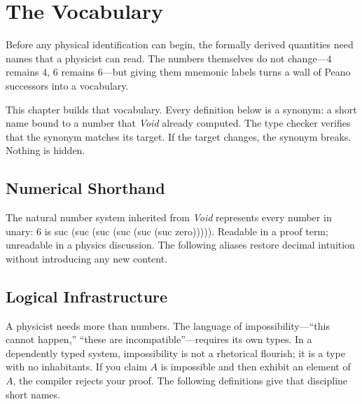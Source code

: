 \documentclass[11pt,a4paper]{book}
\def\texttt#1{#1}%
\begin{document}
\chapter{The Vocabulary}
\label{ch:vocabulary}

Before any physical identification can begin, the formally derived quantities need names that a physicist can read. The numbers themselves do not change---$4$ remains $4$, $6$ remains $6$---but giving them mnemonic labels turns a wall of Peano successors into a vocabulary.

This chapter builds that vocabulary. Every definition below is a synonym: a short name bound to a number that \textit{Void} already computed. The type checker verifies that the synonym matches its target. If the target changes, the synonym breaks. Nothing is hidden.

\section{Numerical Shorthand}

The natural number system inherited from \textit{Void} represents every number in unary: $6$ is \texttt{suc (suc (suc (suc (suc (suc zero)))))}. Readable in a proof term; unreadable in a physics discussion. The following aliases restore decimal intuition without introducing any new content.


\section{Logical Infrastructure}

A physicist needs more than numbers. The language of impossibility---``this cannot happen,'' ``these are incompatible''---requires its own types. In a dependently typed system, impossibility is not a rhetorical flourish; it is a type with no inhabitants. If you claim $A$ is impossible and then exhibit an element of $A$, the compiler rejects your proof. The following definitions give that discipline short names.
\end{document}
